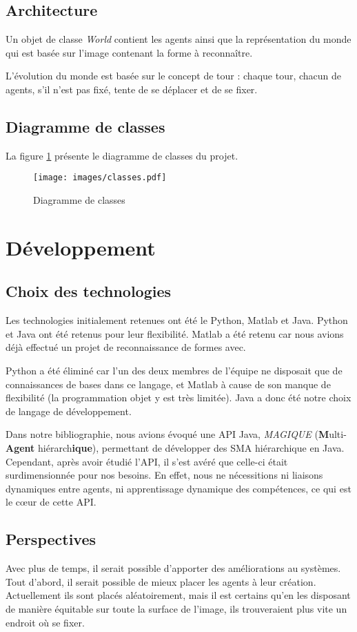 \documentclass[a4paper,12pt]{report}
\begin{document}
\section{Architecture}
Un objet de classe \emph{World} contient les agents ainsi que la représentation du monde qui est basée sur l'image contenant la forme à reconnaître.

L'évolution du monde est basée sur le concept de tour : chaque tour, chacun de agents, s'il n'est pas fixé, tente de se déplacer et de se fixer.

\section{Diagramme de classes}
La figure \ref{fig:dc} présente le diagramme de classes du projet.
\begin{figure}
 \texttt{[image: images/classes.pdf]}
 \caption{Diagramme de classes}
 \label{fig:dc}
\end{figure}


\chapter{Développement}
\section{Choix des technologies}
Les technologies initialement retenues ont été le Python, Matlab et Java. Python et Java ont été retenus pour leur flexibilité. Matlab a été retenu car nous avions déjà effectué un projet de reconnaissance de formes avec.

Python a été éliminé car l'un des deux membres de l'équipe ne disposait que de connaissances de bases dans ce langage, et Matlab à cause de son manque de flexibilité (la programmation objet y est très limitée). Java a donc été notre choix de langage de développement.

Dans notre bibliographie, nous avions évoqué une API Java, \emph{MAGIQUE} (\textbf{M}ulti-\textbf{Agent} hiérarch\textbf{ique}), permettant de développer des SMA hiérarchique en Java. Cependant, après avoir étudié l'API, il s'est avéré que celle-ci était surdimensionnée pour nos besoins. En effet, nous ne nécessitions ni liaisons dynamiques entre agents, ni apprentissage dynamique des compétences, ce qui est le cœur de cette API. 

\section{Perspectives}
Avec plus de temps, il serait possible d'apporter des améliorations au systèmes. Tout d'abord, il serait possible de mieux placer les agents à leur création. Actuellement ils sont placés aléatoirement, mais il est certains qu'en les disposant de manière \og{}équitable\fg{} sur toute la surface de l'image, ils trouveraient plus vite un endroit où se fixer.
\end{document}
